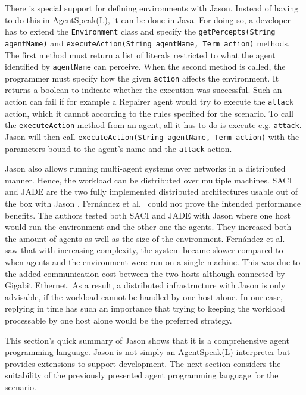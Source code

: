 There is special support for defining environments with Jason.
Instead of having to do this in AgentSpeak(L), it can be done in Java.
For doing so, a developer has to extend the \texttt{Environment} class and specify the \texttt{getPercepts(String agentName)} and \texttt{executeAction(String agentName, Term action)} methods.
The first method must return a list of literals restricted to what the agent identified by \texttt{agentName} can perceive.
When the second method is called, the programmer must specify how the given \texttt{action} affects the environment.
It returns a boolean to indicate whether the execution was successful.
Such an action can fail if for example a Repairer agent would try to execute the \texttt{attack} action, which it cannot according to the rules specified for the \mars scenario.
To call the \texttt{executeAction} method from an agent, all it has to do is execute e.g. \texttt{attack}.
Jason will then call \texttt{executeAction(String agentName, Term action)} with the parameters bound to the agent's name and the \texttt{attack} action.

Jason also allows running multi-agent systems over networks in a distributed manner.
Hence, the workload can be distributed over multiple machines.
SACI~\cite{hubner_saci_2000} and JADE are the two fully implemented distributed architectures usable out of the box with Jason \cite{bordini_programming_2007}.
Fernández et al.~\cite{fernandez_evaluating_2010} could not prove the intended performance benefits.
The authors tested both SACI and JADE with Jason where one host would run the environment and the other one the agents.
They increased both the amount of agents as well as the size of the environment.
Fernández et al.~\cite{fernandez_evaluating_2010} saw that with increasing complexity, the system became slower compared to when agents and the environment were run on a single machine.
This was due to the added communication cost between the two hosts although connected by Gigabit Ethernet.
As a result, a distributed infrastructure with Jason is only advisable, if the workload cannot be handled by one host alone.
In our case, replying in time has such an importance that trying to keeping the workload processable by one host alone would be the preferred strategy.

This section's quick summary of Jason shows that it is a comprehensive agent programming language.
Jason is not simply an AgentSpeak(L) interpreter but provides extensions to support development.
The next section considers the suitability of the previously presented agent programming language for the \mars scenario.
